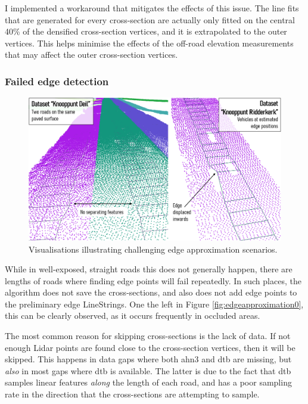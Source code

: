 I implemented a workaround that mitigates the effects of this issue. The line fits that are generated for every cross-section are actually only fitted on the central 40\% of the densified cross-section vertices, and it is extrapolated to the outer vertices. This helps minimise the effects of the off-road elevation measurements that may affect the outer cross-section vertices. 

\subsubsection{Failed edge detection}

\begin{figure}
    \centering
    \includegraphics[width=\linewidth]{final_report/figs/edgeapproximation1.png}
    \caption{Visualisations illustrating challenging edge approximation scenarios.}
    \label{fig:edgeapproximation1}
\end{figure}

While in well-exposed, straight roads this does not generally happen, there are lengths of roads where finding edge points will fail repeatedly. In such places, the algorithm does not save the cross-sections, and also does not add edge points to the preliminary edge LineStrings. One the left in Figure \ref{fig:edgeapproximation0}, this can be clearly observed, as it occurs frequently in occluded areas.

The most common reason for skipping cross-sections is the lack of data. If not enough Lidar points are found close to the cross-section vertices, then it will be skipped. This happens in data gaps where both \ac{ahn3} and \ac{dtb} are missing, but \textit{also} in most gaps where \ac{dtb} is available. The latter is due to the fact that \ac{dtb} samples linear features \textit{along} the length of each road, and has a poor sampling rate in the direction that the cross-sections are attempting to sample.

